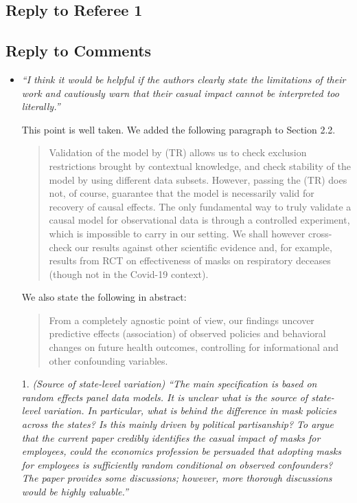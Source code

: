 \documentclass[11pt]{article}
\begin{document}
\newpage

\replytitle
\subsection*{Reply to Referee 1}

\changes
\subsection*{Reply to Comments}
\begin{itemize}

\item  \textit{``I think it would be helpful if the authors clearly state the limitations of their work and
cautiously warn that their casual impact cannot be interpreted too literally.''}
 
 This point is well taken. We added the following paragraph to Section 2.2. 
 \begin{quote}
 Validation of the model by (TR) allows us to check exclusion restrictions brought by contextual knowledge, and check stability of the model by using different data subsets. However, passing the (TR) does not, of course, guarantee that the model is necessarily valid for recovery of causal effects. The only fundamental way to truly validate a causal model for observational data is through a controlled experiment, which is impossible to carry in our setting. We shall however cross-check our results against other scientific evidence and, for example, results from RCT on effectiveness of masks on respiratory deceases (though not in the Covid-19 context).
 \end{quote}
 
 We also state the following in abstract:
 \begin{quote}
 From a completely agnostic point of view,
our findings uncover predictive effects (association) of observed policies and behavioral changes  on future health outcomes,
 controlling for informational and other confounding variables.
\end{quote}
  
\item[1.]   \textit{(Source of state-level variation) ``The main specification is based on random effects panel data
models. It is unclear what is the source of state-level variation. In particular, what is behind
the difference in mask policies across the states? Is this mainly driven by political partisanship?
To argue that the current paper credibly identifies the casual impact of masks for
employees, could the economics profession be persuaded that adopting masks for employees
is sufficiently random conditional on observed confounders? The paper provides some
discussions; however, more thorough discussions would be highly valuable.''}
  

\end{itemize}
\end{document}
